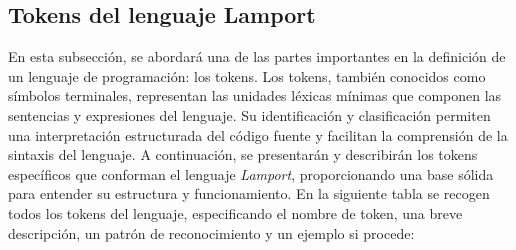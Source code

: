 \subsection{Tokens del lenguaje Lamport}\label{subsec:tokensLamport}
En esta subsección, se abordará una de las partes importantes en la definición de un lenguaje de programación: los tokens. Los tokens, también conocidos como símbolos terminales, representan las unidades léxicas mínimas que componen las sentencias y expresiones del lenguaje. Su identificación y clasificación permiten una interpretación estructurada del código fuente y facilitan la comprensión de la sintaxis del lenguaje. A continuación, se presentarán y describirán los tokens específicos que conforman el lenguaje \textit{Lamport}, proporcionando una base sólida para entender su estructura y funcionamiento. En la siguiente tabla se recogen todos los tokens del lenguaje, especificando el nombre de token, una breve descripción, un patrón de reconocimiento y un ejemplo si procede:

\newpage

